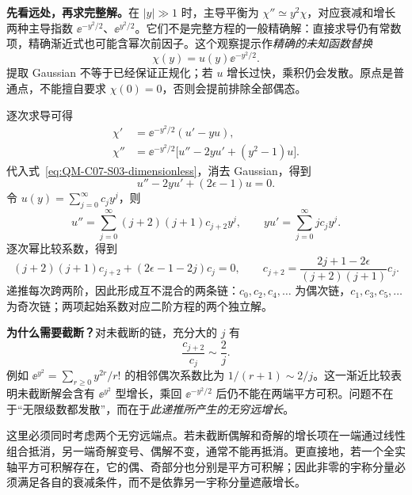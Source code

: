 \textbf{先看远处，再求完整解。}在 $|y|\gg1$ 时，主导平衡为
$\chi''\simeq y^2\chi$，对应衰减和增长两种主导指数
$\ee^{-y^2/2}$、$\ee^{y^2/2}$。它们不是完整方程的一般精确解：直接求导仍有常数项，精确渐近式也可能含幂次前因子。这个观察提示作\emph{精确的未知函数替换}
\begin{equation}
  \chi(y)=u(y)\ee^{-y^2/2}.
\end{equation}
提取 Gaussian 不等于已经保证正规化；若 $u$ 增长过快，乘积仍会发散。原点是普通点，不能擅自要求 $\chi(0)=0$，否则会提前排除全部偶态。

逐次求导可得
\begin{align}
  \chi'&=\ee^{-y^2/2}(u'-yu),\\
  \chi''&=\ee^{-y^2/2}\bigl[u''-2yu'+(y^2-1)u\bigr].
\end{align}
代入式~\eqref{eq:QM-C07-S03-dimensionless}，消去 Gaussian，得到
\begin{equation}
  u''-2yu'+(2\epsilon-1)u=0.
  \label{eq:QM-C07-S03-hermite-ode}
\end{equation}
令 $u(y)=\sum_{j=0}^{\infty}c_jy^j$，则
\begin{equation}
  u''=\sum_{j=0}^{\infty}(j+2)(j+1)c_{j+2}y^j,
  \qquad yu'=\sum_{j=0}^{\infty}jc_jy^j.
\end{equation}
逐次幂比较系数，得到
\begin{equation}
  (j+2)(j+1)c_{j+2}+(2\epsilon-1-2j)c_j=0,
  \qquad
  \boxed{c_{j+2}=\frac{2j+1-2\epsilon}{(j+2)(j+1)}c_j}.
  \label{eq:QM-C07-S03-recursion}
\end{equation}
递推每次跨两阶，因此形成互不混合的两条链：$c_0,c_2,c_4,\ldots$ 为偶次链，$c_1,c_3,c_5,\ldots$ 为奇次链；两项起始系数对应二阶方程的两个独立解。

\textbf{为什么需要截断？}对未截断的链，充分大的 $j$ 有
\begin{equation}
  \frac{c_{j+2}}{c_j}\sim\frac{2}{j}.
\end{equation}
例如 $\ee^{y^2}=\sum_{r\ge0}y^{2r}/r!$ 的相邻偶次系数比为
$1/(r+1)\sim2/j$。这一渐近比较表明未截断解会含有 $\ee^{y^2}$ 型增长，乘回 $\ee^{-y^2/2}$ 后仍不能在两端平方可积。问题不在于“无限级数都发散”，而在于\emph{此递推所产生的无穷远增长}。

这里必须同时考虑两个无穷远端点。若未截断偶解和奇解的增长项在一端通过线性组合抵消，另一端奇解变号、偶解不变，通常不能再抵消。更直接地，若一个全实轴平方可积解存在，它的偶、奇部分也分别是平方可积解；因此非零的宇称分量必须满足各自的衰减条件，而不是依靠另一宇称分量遮蔽增长。

